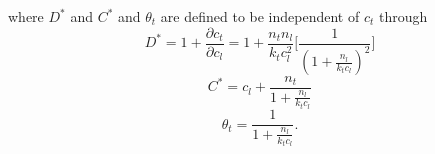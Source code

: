 \documentclass[10pt]{elsarticle}
\newcommand{\mbs}[1]{\boldsymbol{#1}}
\def\bs{{\mbs{s}}} \def\bt{{\mbs{t}}} \def\bu{{\mbs{u}}}
\def\bs{\boldsymbol}
\begin{document}
where $D^{*}$ and $C^{*}$ and $\theta_{t}$ are defined to be independent of $c_{t}$ through
%
\begin{equation}
\label{eq.Dstar}{D^{*} = 1 + \frac{\partial c_{t}}{\partial c_{l}} = 1 + \frac{n_{t} n_{l}}{k_{t} c_{l}^{2}}\bigg[ \frac{1}{(1+ \frac{n_{l}}{k_{t} c_{l}})^{2}}\bigg] }
\end{equation}
%
\begin{equation}
\label{eq.Cstar}{C^{*} = c_{l} +\frac{n_{t}}{1 + \frac{n_{l}}{k_{t} c_{l}}} }
\end{equation}
%
\begin{equation}
\label{eq.thetat2}{\theta_{t} = \frac{1}{1 + \frac{n_{l}}{k_{t} c_{l}}} }.
\end{equation}
%
%
%
%
\end{document}
